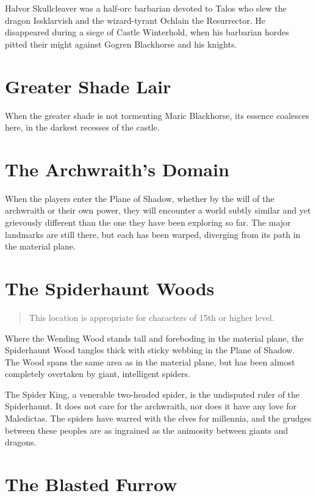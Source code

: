 Halvor Skullcleaver was a half-orc barbarian devoted to Talos who slew the dragon
Issklarvish and the wizard-tyrant Ochlain the Resurrector. He disappeared during
a siege of Castle Winterhold, when his barbarian hordes pitted their might against
Gogren Blackhorse and his knights.

\section{Greater Shade Lair}

When the greater shade is not tormenting Maric Blackhorse, its essence coalesces
here, in the darkest recesses of the castle.

\section{The Archwraith's Domain}

When the players enter the Plane of Shadow, whether by the will of the archwraith
or their own power, they will encounter a world subtly similar and yet grievously
different than the one they have been exploring so far. The major landmarks are still
there, but each has been warped, diverging from its path in the material plane.

\section{The Spiderhaunt Woods} \label{loc:spiderhaunt}

\begin{quote}
  This location is appropriate for characters of 15th or higher level.
\end{quote}

Where the Wending Wood stands tall and foreboding in the material plane, the Spiderhaunt
Wood tangles thick with sticky webbing in the Plane of Shadow. The Wood spans the same
area as in the material plane, but has been almost completely overtaken by giant,
intelligent spiders.

The Spider King, a venerable two-headed spider, is the undisputed ruler of the Spiderhaunt.
It does not care for the archwraith, nor does it have any love for Maledictas.
The spiders have warred with the elves for millennia, and the grudges between these
peoples are as ingrained as the animosity between giants and dragons.

\section{The Blasted Furrow} \label{loc:blastedfurrow}

